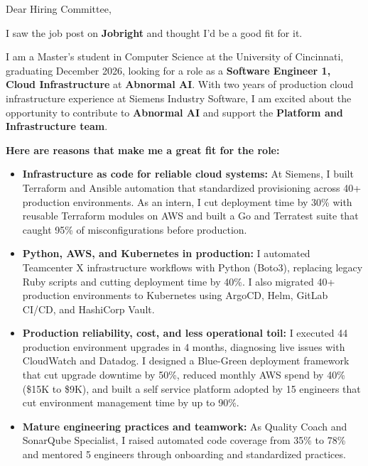 \documentclass[11pt]{letter}
\date{}
\begin{document}
\begin{letter}{}

\opening{Dear Hiring Committee,}

I saw the job post on \textbf{Jobright} and thought I'd be a good fit for it.

I am a Master's student in Computer Science at the University of Cincinnati, graduating December 2026, looking for a role as a \textbf{Software Engineer 1, Cloud Infrastructure} at \textbf{Abnormal AI}. With two years of production cloud infrastructure experience at Siemens Industry Software, I am excited about the opportunity to contribute to \textbf{Abnormal AI} and support the \textbf{Platform and Infrastructure team}.

\textbf{Here are reasons that make me a great fit for the role:}

\begin{itemize}[leftmargin=*, itemsep=0.45em]
    \item \textbf{Infrastructure as code for reliable cloud systems:} At Siemens, I built Terraform and Ansible automation that standardized provisioning across 40+ production environments. As an intern, I cut deployment time by 30\% with reusable Terraform modules on AWS and built a Go and Terratest suite that caught 95\% of misconfigurations before production.

    \item \textbf{Python, AWS, and Kubernetes in production:} I automated Teamcenter X infrastructure workflows with Python (Boto3), replacing legacy Ruby scripts and cutting deployment time by 40\%. I also migrated 40+ production environments to Kubernetes using ArgoCD, Helm, GitLab CI/CD, and HashiCorp Vault.

    \item \textbf{Production reliability, cost, and less operational toil:} I executed 44 production environment upgrades in 4 months, diagnosing live issues with CloudWatch and Datadog. I designed a Blue-Green deployment framework that cut upgrade downtime by 50\%, reduced monthly AWS spend by 40\% (\$15K to \$9K), and built a self service platform adopted by 15 engineers that cut environment management time by up to 90\%.

    \item \textbf{Mature engineering practices and teamwork:} As Quality Coach and SonarQube Specialist, I raised automated code coverage from 35\% to 78\% and mentored 5 engineers through onboarding and standardized practices.


\end{itemize}
\end{letter}
\end{document}
